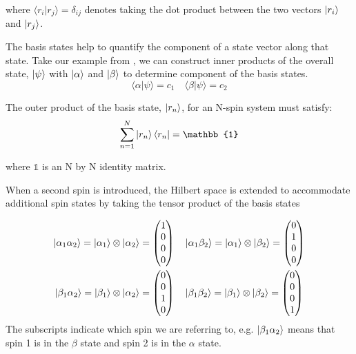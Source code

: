 where $\langle r_i\vert r_j\rangle = \delta_{ij}$ denotes taking the dot product between the two
vectors $\ket{r_i}$ and $\ket{r_j}$.

The basis states help to quantify the component of a state vector along that state. Take our example from , we can construct inner products of the overall state, $\ket{\psi}$ with $\ket{\alpha}$ and $\ket{\beta}$ to determine component of the basis states.
\begin{equation}
  \langle\alpha\vert\psi\rangle = c_1 \quad \langle\beta\vert\psi\rangle = c_2
\end{equation}

The outer product of the basis state, $\ket{r_n}$, for an N-spin system must satisfy:
\begin{equation}
  \sum_{n=1}^{N} \ket{r_n}\bra{r_n} = \mathbb{1}
\end{equation}

where $\mathbb{1}$ is an N by N identity matrix.

When a second spin is introduced, the Hilbert space is extended to accommodate additional spin
states by taking the tensor product of the basis states


\begin{align}\label{eqn:2spinstates}
\ket{\alpha_{1}\alpha_{2}} = \ket{\alpha_1} \otimes \ket{\alpha_2} = \begin{pmatrix}
  1\\
  0\\
  0\\
  0
\end{pmatrix} &\quad
\ket{\alpha_{1}\beta_{2}} = \ket{\alpha_1} \otimes \ket{\beta_2} = \begin{pmatrix}
  0\\
  1\\
  0\\
  0
\end{pmatrix}\\
\ket{\beta_{1}\alpha_{2}} = \ket{\beta_1} \otimes \ket{\alpha_2} = \begin{pmatrix}
  0\\
  0\\
  1\\
  0
\end{pmatrix} &\quad
\ket{\beta_{1}\beta_{2}} = \ket{\beta_1} \otimes \ket{\beta_2} = \begin{pmatrix}
  0\\
  0\\
  0\\
  1
\end{pmatrix}
\end{align}
The subscripts indicate which spin we are referring to, e.g. $\ket{\beta_1\alpha_2}$ means that
spin 1 is in the $\beta$ state and spin 2 is in the $\alpha$ state.

